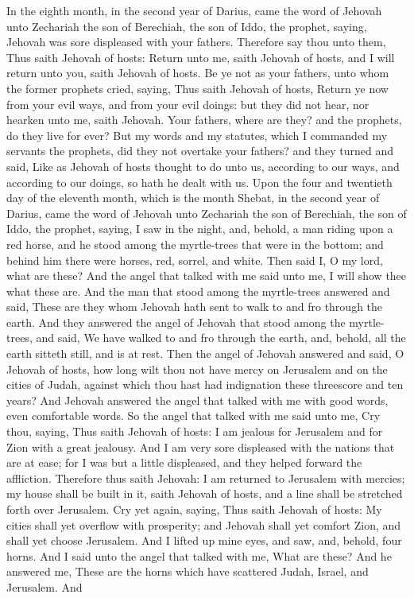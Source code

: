 


In the eighth month, in the second year of Darius, came the word of Jehovah unto Zechariah the son of Berechiah, the son of Iddo, the prophet, saying, Jehovah was sore displeased with your fathers. Therefore say thou unto them, Thus saith Jehovah of hosts: Return unto me, saith Jehovah of hosts, and I will return unto you, saith Jehovah of hosts. Be ye not as your fathers, unto whom the former prophets cried, saying, Thus saith Jehovah of hosts, Return ye now from your evil ways, and from your evil doings: but they did not hear, nor hearken unto me, saith Jehovah. Your fathers, where are they? and the prophets, do they live for ever? But my words and my statutes, which I commanded my servants the prophets, did they not overtake your fathers? and they turned and said, Like as Jehovah of hosts thought to do unto us, according to our ways, and according to our doings, so hath he dealt with us.  Upon the four and twentieth day of the eleventh month, which is the month Shebat, in the second year of Darius, came the word of Jehovah unto Zechariah the son of Berechiah, the son of Iddo, the prophet, saying, I saw in the night, and, behold, a man riding upon a red horse, and he stood among the myrtle-trees that were in the bottom; and behind him there were horses, red, sorrel, and white. Then said I, O my lord, what are these? And the angel that talked with me said unto me, I will show thee what these are. And the man that stood among the myrtle-trees answered and said, These are they whom Jehovah hath sent to walk to and fro through the earth. And they answered the angel of Jehovah that stood among the myrtle-trees, and said, We have walked to and fro through the earth, and, behold, all the earth sitteth still, and is at rest.  Then the angel of Jehovah answered and said, O Jehovah of hosts, how long wilt thou not have mercy on Jerusalem and on the cities of Judah, against which thou hast had indignation these threescore and ten years? And Jehovah answered the angel that talked with me with good words, even comfortable words. So the angel that talked with me said unto me, Cry thou, saying, Thus saith Jehovah of hosts: I am jealous for Jerusalem and for Zion with a great jealousy. And I am very sore displeased with the nations that are at ease; for I was but a little displeased, and they helped forward the affliction. Therefore thus saith Jehovah: I am returned to Jerusalem with mercies; my house shall be built in it, saith Jehovah of hosts, and a line shall be stretched forth over Jerusalem. Cry yet again, saying, Thus saith Jehovah of hosts: My cities shall yet overflow with prosperity; and Jehovah shall yet comfort Zion, and shall yet choose Jerusalem.  And I lifted up mine eyes, and saw, and, behold, four horns. And I said unto the angel that talked with me, What are these? And he answered me, These are the horns which have scattered Judah, Israel, and Jerusalem. And 